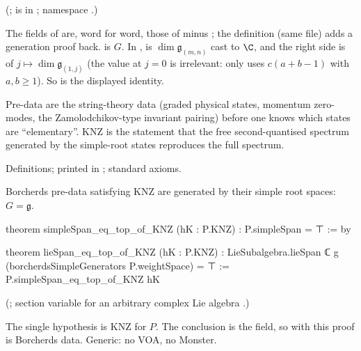 (;\newline {} is in
; namespace .)
\begin{dictionary}
The fields of  are, word for word, those of  minus ; the
definition  (same file) adds a generation proof back.   is $G$.  In ,
 is $\dim\mathfrak g_{(m,n)}$ cast to $\C$, and the right side is
 of $j\mapsto\dim\mathfrak g_{(1,j)}$ (the value at $j=0$ is irrelevant:  only uses
$c(a+b-1)$ with $a,b\ge1$).  So  is the displayed identity.
\end{dictionary}
\begin{physics}
Pre-data are the string-theory data (graded physical states, momentum zero-modes, the Zamolodchikov-type invariant pairing)
before one knows which states are ``elementary''.  KNZ is the statement that the free second-quantised spectrum generated by
the simple-root states reproduces the full spectrum.
\end{physics}
\begin{status}
Definitions; printed in ; standard axioms.
\end{status}

\begin{theorem}\label{ch20:thm:genKNZ}
Borcherds pre-data satisfying KNZ are generated by their simple root spaces: $G=\mathfrak g$.
\end{theorem}
\begin{leancode}
theorem simpleSpan_eq_top_of_KNZ (hK : P.KNZ) : P.simpleSpan = ⊤ := by

theorem lieSpan_eq_top_of_KNZ (hK : P.KNZ) :
    LieSubalgebra.lieSpan ℂ g (borcherdsSimpleGenerators P.weightSpace) = ⊤ :=
  P.simpleSpan_eq_top_of_KNZ hK
\end{leancode}
(; section variable  for an
arbitrary complex Lie algebra .)
\begin{dictionary}
The single hypothesis  is KNZ for $P$.  The conclusion is the  field, so  with this
proof is Borcherds data.  Generic: no VOA, no Monster.
\end{dictionary}

